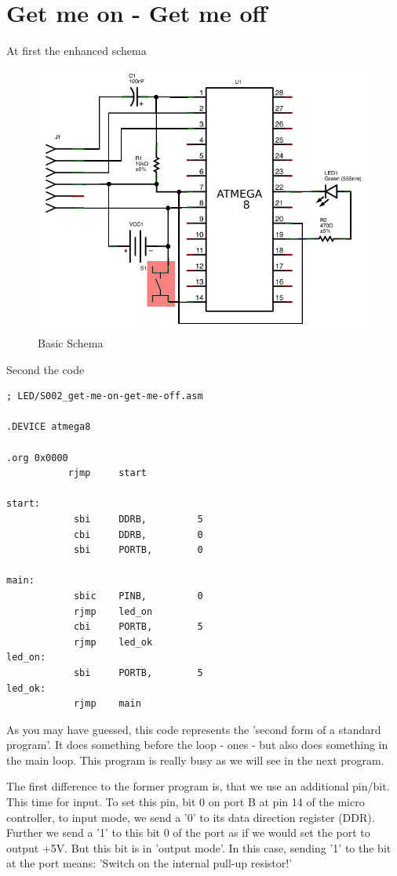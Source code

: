\section{Get me on - Get me off}

At first the enhanced schema

\begin{figure}[htbp]
  \centering
  \includegraphics[width=120mm]{LED/S002_get-me-on-get-me-off_Circuit_schema.png}
  \caption{Basic Schema}
  \label{atmega8-get-me-on-get-me-off-schema}
\end{figure}


Second the code


\begin{lstlisting}
; LED/S002_get-me-on-get-me-off.asm

.DEVICE atmega8

.org 0x0000
           rjmp     start

start:
            sbi     DDRB,         5
            cbi     DDRB,         0
            sbi     PORTB,        0

main:
            sbic    PINB,         0
            rjmp    led_on
            cbi     PORTB,        5
            rjmp    led_ok
led_on:
            sbi     PORTB,        5
led_ok:
            rjmp    main
\end{lstlisting}

As you may have guessed, this code represents the 'second form of a standard program'. It does something before the loop - ones - but also does something in the main loop. This program is really busy as we will see in the next program.

The first difference to the former program is, that we use an additional pin/bit. This time for input. To set this pin, bit 0 on port B at pin 14 of the micro controller, to input mode, we send a '0' to its data direction register (DDR). Further we send a '1' to this bit 0 of the port as if we would set the port to output +5V. But this bit is in 'output mode'. In this case, sending '1' to the bit at the port means: 'Switch on the internal pull-up resistor!'

